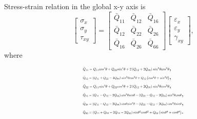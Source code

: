 \documentclass[letterpaper]{IEEEtran}
\begin{document}
Stress-strain relation in the global x-y axis is
\begin{equation}
	\label{equ:stress-strain}
	\left[\begin{array}{l}
			\sigma _{x} \\ 
			\sigma _{y} \\
			\tau_{xy}
			\end{array}
	\right]=
	\left[\begin{array}{lll}
			\bar{Q}_{11} & \bar{Q}_{12} & \bar{Q}_{16}\\ 
			\bar{Q}_{12} & \bar{Q}_{22} & \bar{Q}_{26} \\
			\bar{Q}_{16} & \bar{Q}_{26} &\bar{Q}_{66}
		\end{array}
	 \right]
	 \left[\begin{array}{l}
			 \varepsilon_{x} \\ 
	 		 \varepsilon_{y} \\ 
	 		 \gamma_{x y}
	 		\end{array}
	\right] \textstyle{,}
\end{equation}
where
\begin{equation}
	\begin{array}{l}
		\resizebox{.35\textwidth}{!}{$\bar{Q}_{11}=Q_{11} cos^{4}\theta+Q_{22} sin^{4}\theta+2\left(Q_{12}+2
		Q_{66}\right) sin^{2}\theta cos^{2}\theta$}\textstyle{,} \\
		\resizebox{.35\textwidth}{!}{$\bar{Q}_{12}=\left(Q_{11}+Q_{22}-4 Q_{66}\right) sin^{2}\theta
			cos^{2}\theta+Q_{12}\left(cos^{4}\theta+sin^{2}\theta \right)$} \textstyle{,}\\
		\resizebox{.35\textwidth}{!}{$\bar{Q}_{22}=Q_{11} sin^{4}\theta+Q_{22} cos^{4}\theta+2\left(Q_{12}+2
				Q_{66}\right) sin^{2}\theta cos^{2}\theta$}\textstyle{,} \\
		\resizebox{.40\textwidth}{!}{$\bar{Q}_{16}=\left(Q_{11}-Q_{12}-2
			Q_{66}\right) cos^{3}\theta
			sin\theta-\left(Q_{22}-Q_{12}-2Q_{66}\right) sin^{3}\theta cos\theta$} \textstyle{,}\\ 
		\resizebox{.40\textwidth}{!}{$\bar{Q}_{26}=\left(Q_{11}-Q_{12}-2
			Q_{66}\right) cos\theta sin^{3}\theta-\left(Q_{22}-Q_{12}-2
			Q_{66}\right)cos^{3}\theta sin\theta$} \textstyle{,}\\ 
		\resizebox{.40\textwidth}{!}	{$\bar{Q}_{66}=\left(Q_{11}+Q_{22}-2 Q_{12}-2 Q_{66}\right)
			sin\theta^{2}cos\theta^{2}+Q_{66}\left(sin\theta^{4}+cos\theta^{4}\right)$}\textstyle{.}\\
	\end{array}
\end{equation}
\end{document}
